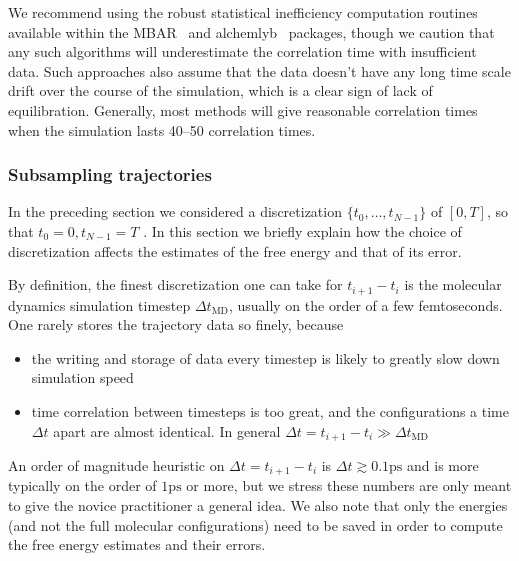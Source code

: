 \documentclass[9pt,bestpractices]{livecoms}
\begin{document}
We recommend using the robust statistical inefficiency computation routines available within the MBAR~\cite{kylebeauchamp2019choderalab} and alchemlyb~\cite{daviddotson2019alchemistry} packages, though we caution that any such algorithms will underestimate the correlation time with insufficient data. Such approaches also assume that the data doesn't have any long time scale drift over the course of the simulation, which is a clear sign of lack of equilibration.  Generally, most methods will give reasonable correlation times when the simulation lasts 40--50 correlation times.


\subsubsection{Subsampling trajectories}

In the preceding section we considered a discretization   $\{t_0, \dots, t_{N-1}\}$ of $[0,T]$, so that $t_0=0, t_{N-1}=T$ . In this section we briefly explain how the choice of discretization affects the estimates of the free energy and that of its error. 

By definition, the finest discretization one can take for $t_{i+1} - t_i$ is the molecular dynamics simulation timestep $\Delta t_{\mathrm{MD}}$, usually on the order of a few femtoseconds. One rarely stores the trajectory data so finely, because 
\begin{itemize}
    \item the writing and storage of data every timestep is likely to greatly slow down simulation speed
    \item time correlation between timesteps is too great, and the configurations a time $\Delta t$ apart are almost identical. In general $\Delta t = t_{i+1} - t_i \gg \Delta t_{\mathrm{MD}}$
\end{itemize}

An order of magnitude heuristic on $\Delta t =t_{i+1} - t_i$ is $\Delta t \gtrsim 0.1 \mathrm{ps}$ and is more typically on the order of $1 \mathrm{ps}$ or more,  but we stress these numbers are only meant to give the novice practitioner a general idea. We also note that only the energies (and not the full molecular configurations) need to be saved in order to compute the free energy estimates and their errors. 
\end{document}

